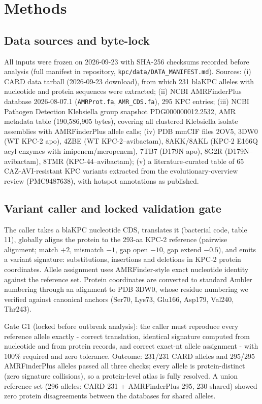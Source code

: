 \documentclass[11pt]{article}
\begin{document}
\section{Methods}
\subsection{Data sources and byte-lock}
All inputs were frozen on 2026-09-23 with SHA-256 checksums recorded before analysis (full manifest in repository, \texttt{kpc/data/DATA\_MANIFEST.md}). Sources: (i) CARD data tarball (2026-09-23 download), from which 231 blaKPC alleles with nucleotide and protein sequences were extracted; (ii) NCBI AMRFinderPlus database 2026-08-07.1 (\texttt{AMRProt.fa}, \texttt{AMR\_CDS.fa}), 295 KPC entries; (iii) NCBI Pathogen Detection Klebsiella group snapshot PDG000000012.2532, AMR metadata table (190,586,905 bytes), covering all clustered Klebsiella isolate assemblies with AMRFinderPlus allele calls; (iv) PDB mmCIF files 2OV5, 3DW0 (WT KPC-2 apo), 4ZBE (WT KPC-2--avibactam), 8AKK/8AKL (KPC-2 E166Q acyl-enzymes with imipenem/meropenem), 7TB7 (D179N apo), 8G2R (D179N--avibactam), 8TMR (KPC-44--avibactam); (v) a literature-curated table of 65 CAZ-AVI-resistant KPC variants extracted from the evolutionary-overview review (PMC9487638), with hotspot annotations as published.

\subsection{Variant caller and locked validation gate}
The caller takes a blaKPC nucleotide CDS, translates it (bacterial code, table 11), globally aligns the protein to the 293-aa KPC-2 reference (pairwise alignment; match $+2$, mismatch $-1$, gap open $-10$, gap extend $-0.5$), and emits a variant signature: substitutions, insertions and deletions in KPC-2 protein coordinates. Allele assignment uses AMRFinder-style exact nucleotide identity against the reference set. Protein coordinates are converted to standard Ambler numbering through an alignment to PDB 3DW0, whose residue numbering we verified against canonical anchors (Ser70, Lys73, Glu166, Asp179, Val240, Thr243).

Gate G1 (locked before outbreak analysis): the caller must reproduce every reference allele exactly - correct translation, identical signature computed from nucleotide and from protein records, and correct exact-nt allele assignment - with 100\% required and zero tolerance. Outcome: 231/231 CARD alleles and 295/295 AMRFinderPlus alleles passed all three checks; every allele is protein-distinct (zero signature collisions), so a protein-level atlas is fully resolved. A union reference set (296 alleles: CARD 231 + AMRFinderPlus 295, 230 shared) showed zero protein disagreements between the databases for shared alleles.
\end{document}
